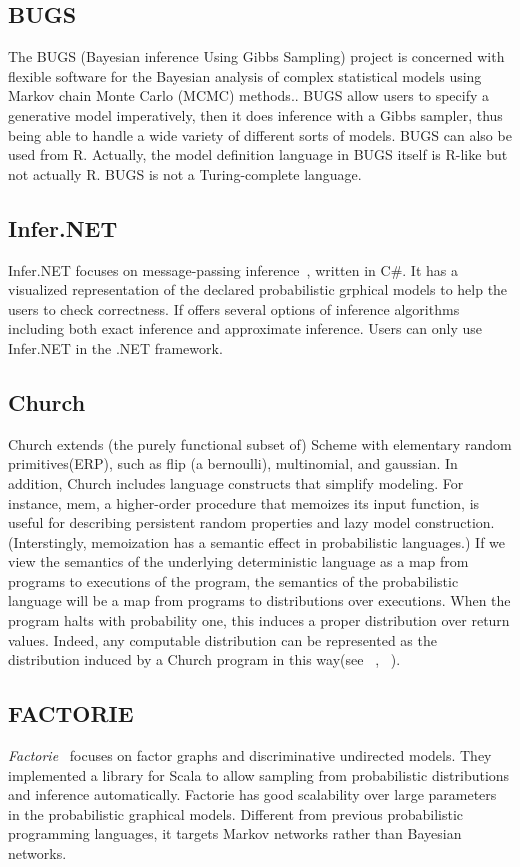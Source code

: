\subsection{BUGS}
The BUGS (Bayesian inference Using Gibbs Sampling) project is concerned with flexible software for the Bayesian analysis of complex statistical models using Markov chain Monte Carlo (MCMC) methods.\cite{bugs}. BUGS allow users to specify a generative model imperatively, then it does inference with a Gibbs sampler, thus being able to handle a wide variety of different sorts of models. BUGS can also be used from R. Actually, the model definition language in BUGS itself is R-like but not actually R. BUGS is not a Turing-complete language.

\subsection{Infer.NET}
Infer.NET focuses on message-passing inference~\cite{bishop}, written in C\#. It has a visualized representation of the declared probabilistic grphical models to help the users to check correctness. If offers several options of inference algorithms including both exact inference and approximate inference. Users can only use Infer.NET in the .NET framework.

\subsection{Church}
Church extends (the purely functional subset of) Scheme with elementary random primitives(ERP), such as flip (a bernoulli), multinomial, and gaussian. In addition, Church includes language constructs that simplify modeling. For instance, mem, a higher-order procedure that memoizes its input function, is useful for describing persistent random properties and lazy model construction. (Interstingly, memoization has a semantic effect in probabilistic languages.) If we view the semantics of the underlying deterministic language as a map from programs to executions of the program, the semantics of the probabilistic language will be a map from programs to distributions over executions. When the program halts with probability one, this induces a proper distribution over return values. Indeed, any computable distribution can be represented as the distribution induced by a Church program in this way(see ~\cite{goodman}, ~\cite{church}).

\subsection{FACTORIE}
\textit{Factorie}~\cite{factorie} focuses on factor graphs and discriminative undirected models. They implemented a library for Scala to allow sampling from probabilistic distributions and inference automatically. Factorie has good scalability over large parameters in the probabilistic graphical models. Different from previous probabilistic programming languages, it targets Markov networks rather than Bayesian networks.

